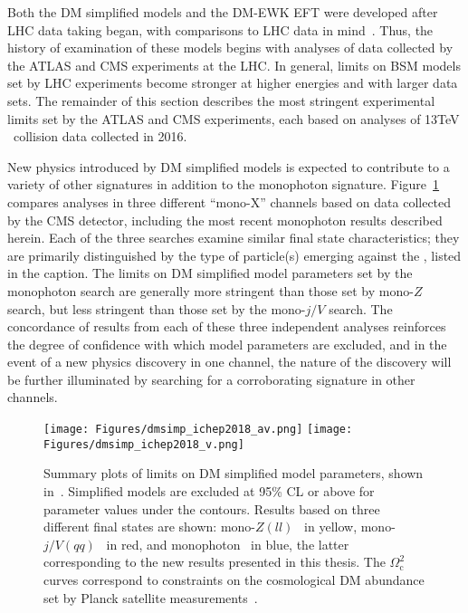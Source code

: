 Both the DM simplified models and the DM-EWK EFT were developed after LHC data taking began, with comparisons to LHC data in mind~\cite{ref:1507.00966, ref:PhysRevD.89.056011}.
Thus, the history of examination of these models begins with analyses of data collected by the ATLAS and CMS experiments at the LHC.
In general, limits on BSM models set by LHC experiments become stronger at higher energies and with larger data sets.
The remainder of this section describes the most stringent experimental limits set by the ATLAS and CMS experiments, each based on analyses of 13\unit{TeV} \Pp\Pp\ collision data
collected in 2016.

New physics introduced by DM simplified models is expected to contribute to a variety of other signatures in addition to the monophoton signature. Figure~\ref{fig:dmsimp_ichep2018} compares
analyses in three different ``mono-X'' channels based on data collected by the CMS detector, including the most recent monophoton results described herein. Each of the three
searches examine similar final state characteristics; they are primarily distinguished by the type of particle(s) emerging against the \vecMET, listed in the caption.
The limits on DM simplified model parameters set by the monophoton search are generally more stringent than those set by mono-$Z$ search, but less stringent
than those set by the mono-$j/V$ search. The concordance of results from each of these three independent analyses reinforces the degree of confidence with which model
parameters are excluded, and in the event of a new physics discovery in one channel, the nature of the discovery will be further illuminated by searching for a corroborating
signature in other channels.

\begin{figure}[hbtb]
  \begin{center}
    \texttt{[image: Figures/dmsimp\_ichep2018\_av.png]}
    \texttt{[image: Figures/dmsimp\_ichep2018\_v.png]}
    \caption{Summary plots of limits on DM simplified model parameters, shown in~\cite{ref:dmsummaryplots_ichep2018}. Simplified models are excluded at 95\% CL or above
    for parameter values under the contours.
    Results based on three different final states are shown: mono-$Z(ll)$~\cite{ref:epjc/s10052-018-5740-1} in yellow, mono-$j/V(qq)$~\cite{ref:PhysRevD.97.092005} in red, and monophoton~\cite{ref:JHEP02(2019)074} in blue,
    the latter corresponding to the new results presented in this thesis. The $\Omega_\mathrm{c}^{2}$ curves correspond to constraints on the cosmological DM abundance set by Planck satellite measurements~\cite{ref:planck2018_cosparams}.}
    \label{fig:dmsimp_ichep2018}
  \end{center}
\end{figure}

